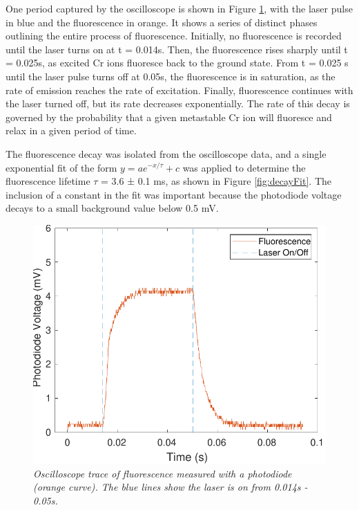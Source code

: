 \documentclass[11pt, a4paper, twocolumn]{article}
\begin{document}
One period captured by the oscilloscope is shown in Figure \ref{fig:fluorescencePeriod}, with the laser pulse in blue and the fluorescence in orange. It shows a series of distinct phases outlining the entire process of fluorescence. Initially, no fluorescence is recorded until the laser turns on at t = 0.014s. Then, the fluorescence rises sharply until t = 0.025s, as excited Cr ions fluoresce back to the ground state. From t = 0.025 s until the laser pulse turns off at 0.05s, the fluorescence is in saturation, as the rate of emission reaches the rate of excitation. Finally, fluorescence continues with the laser turned off, but its rate decreases exponentially. The rate of this decay is governed by the probability that a given metastable Cr ion will fluoresce and relax in a given period of time. 

The fluorescence decay was isolated from the oscilloscope data, and a single exponential fit of the form $y = ae^{-x/\tau} + c$ was applied to determine the fluorescence lifetime $\tau$ = 3.6 ± 0.1 ms, as shown in Figure \ref{fig:decayFit}. The inclusion of a constant in the fit was important because the photodiode voltage decays to a small background value below 0.5 mV.

\begin{figure} [t]
\includegraphics[width=\linewidth]{fluorescencePeriod.pdf}
\caption{\textit{Oscilloscope trace of fluorescence measured with a photodiode (orange curve). The blue lines show the laser is on from 0.014s - 0.05s.}}
\label{fig:fluorescencePeriod}
\end{figure}
\end{document}
